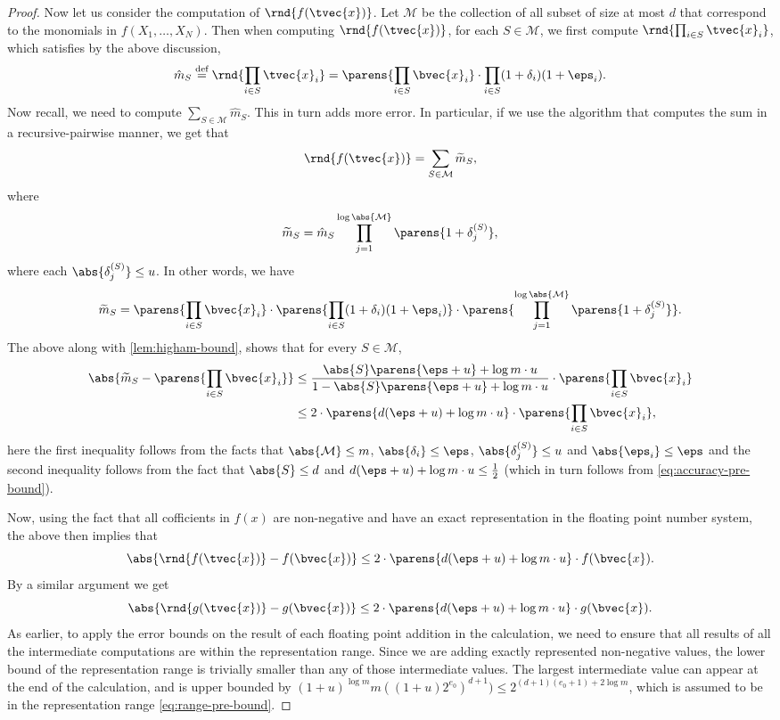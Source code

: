 \documentclass[11pt]{article}
\begin{document}
\begin{proof}
    Now let us consider the computation of $\rnd{f(\tvec{x})}$. Let $\mathcal M$ be the collection of all subset of size at most $d$ that correspond to the monomials in $f(X_1,\dots,X_N)$. Then when computing $\rnd{f(\tvec{x})}$, for each $S\in \mathcal{M}$, we first compute $\rnd{\prod_{i\in S} \tvec{x}_i}$, which satisfies by the above discussion,
        \[\hat{m}_S\stackrel{\text{def}}{=}\rnd{\prod_{i\in S} \tvec{x}_i}=\parens{\prod_{i\in S} \bvec{x}_i}\cdot \prod_{i\in S}(1+\delta_i)(1+\eps_i).\]
    Now recall, we need to compute $\sum_{S\in \mathcal{M}} \hat{m}_S$. This in turn adds more error. In particular, if we use the algorithm that computes the sum in a recursive-pairwise manner, we get that
    \[\rnd{f(\tvec{x})} = \sum_{S\in \mathcal{M}} \widetilde{m}_S,\]
    where
    \[\widetilde{m}_S = \hat{m}_S\prod_{j=1}^{\log{\abs{\mathcal{M}}}} \parens{1+\delta^{(S)}_j},\]
    where each $\abs{\delta^{(S)}_j}\le u$. In other words, we have
    \[\widetilde{m}_S = \parens{\prod_{i\in S} \bvec{x}_i}\cdot \parens{\prod_{i\in S}(1+\delta_i)(1+\eps_i)}\cdot \parens{\prod_{j=1}^{\log{\abs{\mathcal{M}}}} \parens{1+\delta^{(S)}_j}}.\]
    The above along with \cref{lem:higham-bound}, shows that for every $S\in\mathcal{M}$,
    \begin{align*}
    \abs{\widetilde{m}_S - \parens{\prod_{i\in S} \bvec{x}_i}} & \le \frac{\abs{S}\parens{\eps+u}+\log{m}\cdot u}{1- \abs{S}\parens{\eps+u}+\log{m}\cdot u} \cdot \parens{\prod_{i\in S} \bvec{x}_i}\\
    & \le 2\cdot\parens{d(\eps+u)+\log{m}\cdot u}\cdot \parens{\prod_{i\in S} \bvec{x}_i},        
    \end{align*}
    here the first inequality follows from the facts that $\abs{\mathcal{M}}\le m$, $\abs{\delta_i}\le \eps$, $\abs{\delta^{(S)}_j}\le u$ and $\abs{\eps_i}\le \eps$ and the second inequality follows from the fact that $\abs{S}\le d$ and $d(\eps+u)+\log{m}\cdot u\le \frac{1}{2}$ (which in turn follows from \cref{eq:accuracy-pre-bound}).
    
    Now, using the fact that all cofficients in $f(x)$ are non-negative and have an exact representation in the floating point number system, the above then implies that
    \[\abs{\rnd{f(\tvec{x})} - f(\bvec{x})} \le 2\cdot\parens{d(\eps+u)+\log{m}\cdot u}\cdot f(\bvec{x}).\]
    By a similar argument we get
        \[\abs{\rnd{g(\tvec{x})} - g(\bvec{x})} \le 2\cdot\parens{d(\eps+u)+\log{m}\cdot u}\cdot g(\bvec{x}).\]
     As earlier, to apply the error bounds on the result of each floating point addition in the calculation, we need to ensure that all results of all the intermediate computations are within the representation range. Since we are adding exactly represented non-negative values, the lower bound of the representation range is trivially smaller  than any of those intermediate values. The largest intermediate value can appear at the end of the calculation, and is upper bounded by $(1+u)^{\log m} m ((1+u) 2^{e_0})^{d+1}) \leq 2^{(d+1)(e_0 + 1) + 2 \log m}$, which is assumed to be in the representation range \eqref{eq:range-pre-bound}.  
    

\end{proof}
\end{document}
